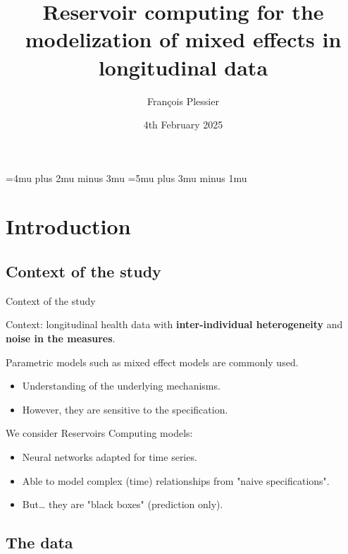 \documentclass{beamer}
\title{Reservoir computing for the modelization of mixed effects in longitudinal data}
\author{François Plessier}
\date{4th February 2025}
\begin{document}
\medmuskip=4mu plus 2mu minus 3mu
\thickmuskip=5mu plus 3mu minus 1mu



\frame{\titlepage}


\begin{frame}
	\tableofcontents
\end{frame}


\section{Introduction}

\subsection{Context of the study}


\begin{frame}{Context of the study}

	Context: longitudinal health data with \textbf{inter-individual heterogeneity} and \textbf{noise in the measures}.

	\bigskip


	Parametric models such as mixed effect models are commonly used.\\
	\begin{itemize}
		\item Understanding of the underlying mechanisms.
		\item However, they are sensitive to the specification.
	\end{itemize}

	\bigskip

	We consider Reservoirs Computing models:
	\begin{itemize}
		\item Neural networks adapted for time series.
		\item Able to model complex (time) relationships from "naive specifications".
		\item But… they are "black boxes" (prediction only).
	\end{itemize}


\end{frame}


\subsection{The data}
\end{document}
